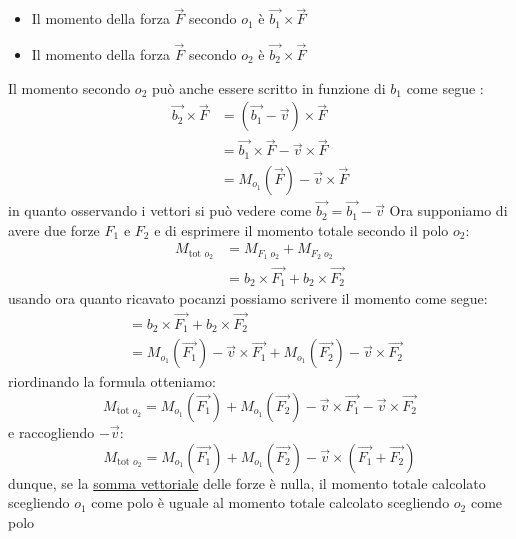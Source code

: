 \begin{itemize}
	\item Il momento della forza $ \vec{F} $ secondo $ o_1 $ è $ \vec{b_1} \times \vec{F} $
	\item Il momento della forza $ \vec{F} $ secondo $ o_2 $ è $ \vec{b_2} \times \vec{F} $
\end{itemize}
Il momento secondo $ o_2 $ può anche essere scritto in funzione di $ b_1 $ come segue :
\begin{align*}
	\vec{b_2} \times \vec{F} & = \left(\vec{b_1} - \vec{v}\right) \times \vec{F}       \\
	                         & = \vec{b_1} \times \vec{F} - \vec{v} \times  \vec{F}    \\
	                         & = M_{o_1}\left(\vec{F}\right) - \vec{v} \times  \vec{F}
\end{align*}
in quanto osservando i vettori si può vedere come $ \vec{b_2} = \vec{b_1} - \vec{v} $
Ora supponiamo di avere due forze $ F_1 $ e $ F_2 $  e di esprimere il momento totale secondo il polo $ o_2 $:
\begin{align*}
	M_{\text{tot }o_2} & = M_{F_1\;o_2} + M_{F_2\;o_2}                 \\
	                   & = b_2 \times \vec{F_1} + b_2 \times \vec{F_2}
\end{align*}
usando ora quanto ricavato pocanzi possiamo scrivere il momento come segue:
\begin{align*}
	 & = b_2 \times \vec{F_1} + b_2 \times \vec{F_2}                                                                         \\
	 & = M_{o_1}\left(\vec{F_1}\right) - \vec{v} \times \vec{F_1} + M_{o_1}\left(\vec{F_2}\right) - \vec{v} \times \vec{F_2}
\end{align*}
riordinando la formula otteniamo:
\[
	M_{\text{tot }o_2}= M_{o_1}\left(\vec{F_1}\right) + M_{o_1}\left(\vec{F_2}\right) - \vec{v} \times \vec{F_1}  - \vec{v} \times \vec{F_2}
\]
e raccogliendo $ -\vec{v} $:
\[
	M_{\text{tot }o_2} = M_{o_1}\left(\vec{F_1}\right) + M_{o_1}\left(\vec{F_2}\right) - \vec{v} \times \left(\vec{F_1}  + \vec{F_2}\right)
\]
dunque, se la \underline{somma vettoriale} delle forze è nulla, il momento totale calcolato scegliendo $ o_1 $ come polo è uguale al momento totale calcolato scegliendo $ o_2 $ come polo


